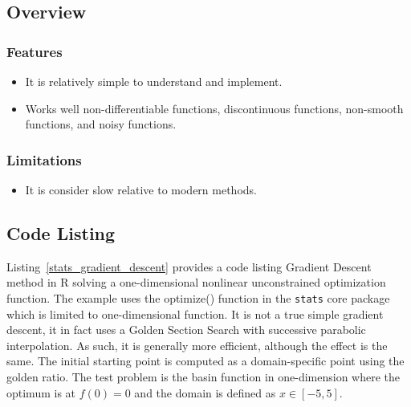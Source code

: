 \subsection{Overview}

\subsubsection{Features}

\begin{itemize}
	\item It is relatively simple to understand and implement.
	\item Works well non-differentiable functions, discontinuous functions, non-smooth functions, and noisy functions.
\end{itemize}

\subsubsection{Limitations}

\begin{itemize}
	\item It is consider slow relative to modern methods.
\end{itemize}

\subsection{Code Listing}
Listing~\ref{stats_gradient_descent} provides a code listing Gradient Descent method in R solving a one-dimensional nonlinear unconstrained optimization function.
The example uses the {optimize()} function in the \texttt{stats} core package which is limited to one-dimensional function. It is not a true simple gradient descent, it in fact uses a Golden Section Search with successive parabolic interpolation. As such, it is generally more efficient, although the effect is the same. The initial starting point is computed as a domain-specific point using the golden ratio.
The test problem is the basin function in one-dimension where the optimum is at $f(0)=0$ and the domain is defined as $x \in [-5,5]$. 




